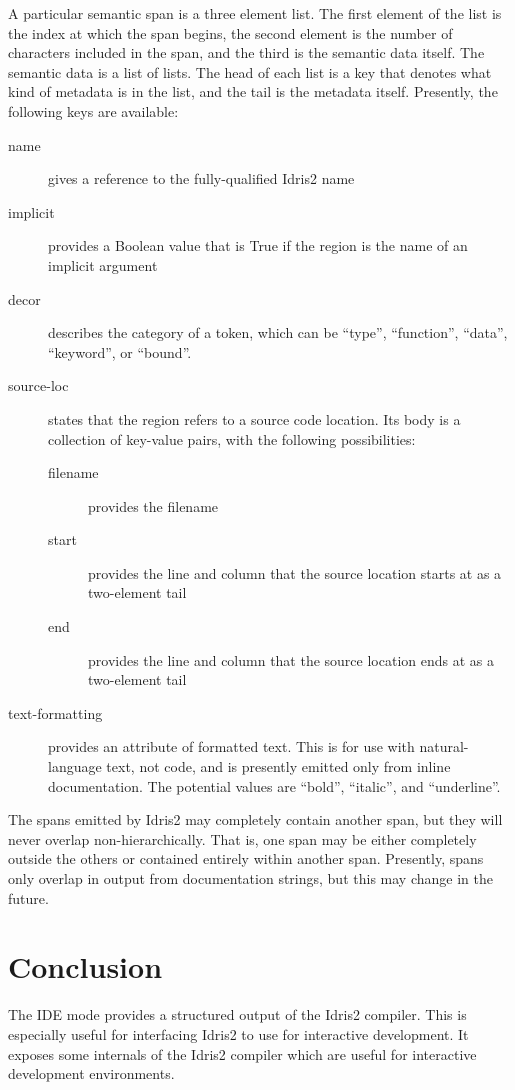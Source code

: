 \documentclass{article}
\begin{document}
A particular semantic span is a three element list.
The first element of the list is the index at which the span begins, the second element is the number of characters included in the span, and the third is the semantic data itself.
The semantic data is a list of lists.
The head of each list is a key that denotes what kind of metadata is in the list, and the tail is the metadata itself.
Presently, the following keys are available:
\begin{description}
\item[name] gives a reference to the fully-qualified Idris2 name
\item[implicit] provides a Boolean value that is True if the region is the name of an implicit argument
\item[decor] describes the category of a token, which can be ``type'', ``function'', ``data'', ``keyword'', or ``bound''.
\item[source-loc] states that the region refers to a source code location. Its body is a collection of key-value pairs, with the following possibilities:
  \begin{description}
  \item[filename] provides the filename
  \item[start] provides the line and column that the source location starts at as a two-element tail
  \item[end]  provides the line and column that the source location ends at as a two-element tail
  \end{description}
\item[text-formatting] provides an attribute of formatted text. This is for use with natural-language text, not code, and is presently emitted only from inline documentation. The potential values are ``bold'', ``italic'', and ``underline''.

\end{description}

The spans emitted by Idris2 may completely contain another span, but they will never overlap non-hierarchically. That is, one span may be either completely outside the others or contained entirely within another span.
Presently, spans only overlap in output from documentation strings, but this may change in the future.

\section{Conclusion}
The IDE mode provides a structured output of the Idris2 compiler.
This is especially useful for interfacing Idris2 to use for interactive development.
It exposes some internals of the Idris2 compiler which are useful for interactive development environments.
\end{document}
